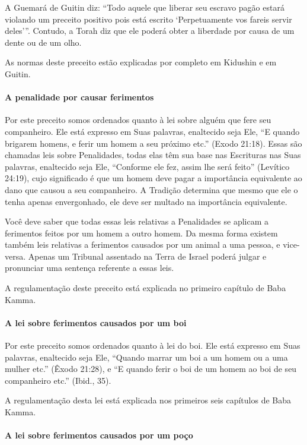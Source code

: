 A Guemará de Guitin diz: ``Todo aquele que liberar seu escravo pagão
estará violando um preceito positivo pois está escrito `Perpetuamente
vos fareis servir deles'''. Contudo, a Torah diz que ele poderá obter a
liberdade por causa de um dente ou de um olho.

As normas deste preceito estão explicadas por completo em Kidushin e em
Guitin.

\paragraph{A penalidade por causar ferimentos}

Por este preceito somos ordenados quanto à lei sobre alguém que fere seu
companheiro. Ele está expresso em Suas palavras, enaltecido seja Ele,
``E quando brigarem homens, e ferir um homem a seu próximo etc.'' (Exodo
21:18). Essas são chamadas leis sobre Penalidades, todas elas têm sua
base nas Escrituras nas Suas palavras, enaltecido seja Ele, ``Conforme
ele fez, assim lhe será feito'' (Levítico 24:19), cujo significado é que
um homem deve pagar a importância equivalente ao dano que causou a seu
companheiro. A Tradição determina que mesmo que ele o tenha apenas
envergonhado, ele deve ser multado na importância equivalente.

Você deve saber que todas essas leis relativas a Penalidades se aplicam
a ferimentos feitos por um homem a outro homem. Da mesma forma existem também leis relativas a ferimentos causados por um animal a uma
pessoa, e vice-versa. Apenas um Tribunal assentado na Terra de Israel
poderá julgar e pronunciar uma sentença referente a essas leis.

A regulamentação deste preceito está explicada no primeiro capítulo de
Baba Kamma.

\paragraph{A lei sobre ferimentos causados por um boi}

Por este preceito somos ordenados quanto à lei do boi. Ele está
expresso em Suas palavras, enaltecido seja Ele, ``Quando marrar um boi
a um homem ou a uma mulher etc.'' (Êxodo 21:28), e ``E quando ferir o
boi de um homem ao boi de seu companheiro etc.'' (Ibid., 35).

A regulamentação desta lei está explicada nos primeiros seis capítulos
de Baba Kamma.

\paragraph{A lei sobre ferimentos causados por um poço}

